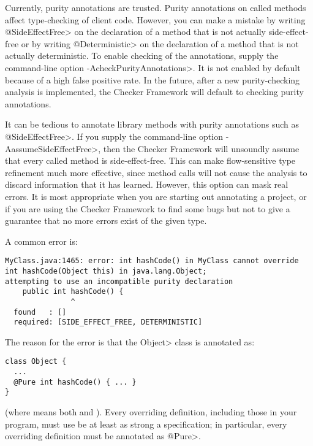 
Currently, purity annotations are trusted.  Purity annotations on called
methods affect type-checking of client code.  However, you can make a
mistake by writing \<@SideEffectFree> on the declaration of a method that
is not actually side-effect-free or by writing \<@Deterministic> on the
declaration of a method that is not actually deterministic.  To enable
checking of the annotations, supply the command-line option
\<-AcheckPurityAnnotations>.  It is not enabled by default because of a high false
positive rate.  In the future, after a new purity-checking analysis is
implemented, the Checker Framework will default to checking purity
annotations.

It can be tedious to annotate library methods with purity annotations such
as \<@SideEffectFree>.  If you supply the command-line option
\<-AassumeSideEffectFree>, then the Checker Framework will unsoundly
assume that every called method is side-effect-free.  This can make
flow-sensitive type refinement much more effective, since method calls will
not cause the analysis to discard information that it has learned.
However, this option can mask real errors.  It is most appropriate when you
are starting out annotating a project, or if you are using the Checker
Framework to find some bugs but not to give a guarantee that no more errors
exist of the given type.

A common error is:

\begin{mysmall}
\begin{Verbatim}
MyClass.java:1465: error: int hashCode() in MyClass cannot override int hashCode(Object this) in java.lang.Object;
attempting to use an incompatible purity declaration
    public int hashCode() {
               ^
  found   : []
  required: [SIDE_EFFECT_FREE, DETERMINISTIC]
\end{Verbatim}
\end{mysmall}

\noindent
The reason for the error is that the \<Object> class is annotated as:

\begin{Verbatim}
class Object {
  ...
  @Pure int hashCode() { ... }
}
\end{Verbatim}

\noindent
(where  means both
 and
).  Every overriding
definition, including those in your program, must use be at least as strong
a specification; in particular, every overriding definition must be
annotated as \<@Pure>.

